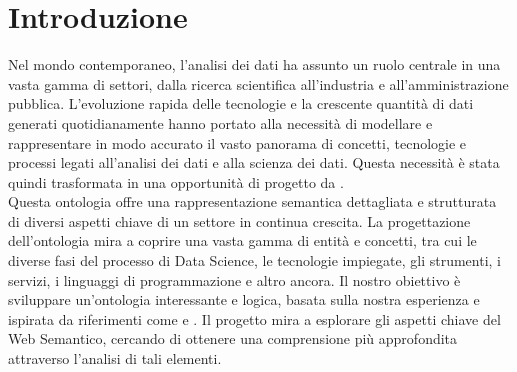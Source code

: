 \chapter{Introduzione}

Nel mondo contemporaneo, l'analisi dei dati ha assunto un ruolo centrale in una vasta gamma di settori, dalla ricerca scientifica all'industria e all'amministrazione pubblica. L'evoluzione rapida delle tecnologie e la crescente quantità di dati generati quotidianamente hanno portato alla necessità di modellare e rappresentare in modo accurato il vasto panorama di concetti, tecnologie e processi legati all'analisi dei dati e alla scienza dei dati. Questa necessità è stata quindi trasformata in una opportunità di progetto da \cite{BDOnto}.\\

Questa ontologia offre una rappresentazione semantica dettagliata e strutturata di diversi aspetti chiave di un settore in continua crescita. La progettazione dell'ontologia mira a coprire una vasta gamma di entità e concetti, tra cui le diverse fasi del processo di Data Science, le tecnologie impiegate, gli strumenti, i servizi, i linguaggi di programmazione e altro ancora. Il nostro obiettivo è sviluppare un'ontologia interessante e logica, basata sulla nostra esperienza e ispirata da riferimenti come \cite{BDOnto} e \cite{BDOnto_PhD}. Il progetto mira a esplorare gli aspetti chiave del Web Semantico, cercando di ottenere una comprensione più approfondita attraverso l'analisi di tali elementi.